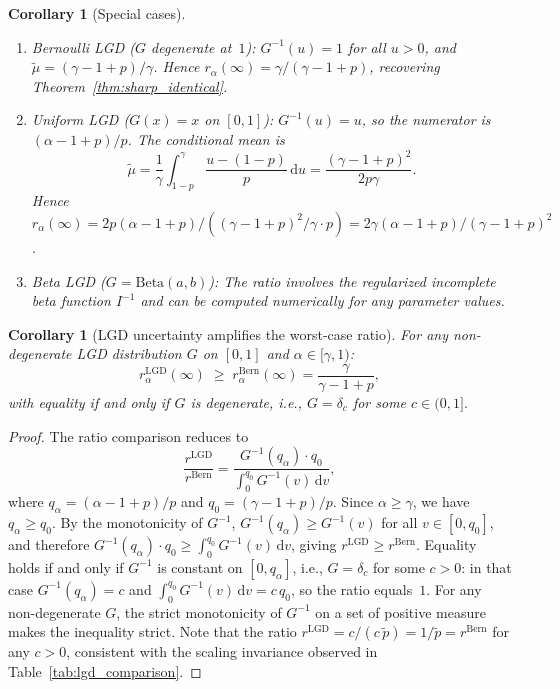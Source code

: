 \documentclass[11pt]{article}
\newtheorem{corollary}[theorem]{Corollary}
\theoremstyle{definition}
\newcommand{\dd}{\mathrm{d}}
\newcommand{\1}{\mathbf{1}}
\begin{document}
\begin{corollary}[Special cases]\label{cor:lgd_special}
\mbox{}
\begin{enumerate}[label=(\alph*)]
  \item \emph{Bernoulli LGD} ($G$ degenerate at~$1$): $G^{-1}(u) = 1$ for all $u > 0$, and $\tilde{\mu} = (\gamma - 1 + p)/\gamma$. Hence $r_\alpha(\infty) = \gamma/(\gamma - 1 + p)$, recovering Theorem~\ref{thm:sharp_identical}.

  \item \emph{Uniform LGD} ($G(x) = x$ on $[0,1]$): $G^{-1}(u) = u$, so the numerator is $(\alpha - 1 + p)/p$. The conditional mean is
  \[
    \tilde{\mu} = \frac{1}{\gamma}\int_{1-p}^\gamma \frac{u - (1-p)}{p}\,\dd u = \frac{(\gamma - 1 + p)^2}{2p\gamma}.
  \]
  Hence $r_\alpha(\infty) = 2p(\alpha - 1 + p) / ((\gamma - 1 + p)^2/\gamma \cdot p) = 2\gamma(\alpha - 1 + p)/(\gamma - 1 + p)^2$.

  \item \emph{Beta LGD} ($G = \mathrm{Beta}(a,b)$): The ratio involves the regularized incomplete beta function $I^{-1}$ and can be computed numerically for any parameter values.
\end{enumerate}
\end{corollary}

\begin{corollary}[LGD uncertainty amplifies the worst-case ratio]\label{cor:lgd_amplification}
For any non-degenerate LGD distribution $G$ on $[0,1]$ and $\alpha \in [\gamma, 1)$:
\begin{equation}\label{eq:lgd_amplification}
  r_\alpha^{\mathrm{LGD}}(\infty) \;\geq\; r_\alpha^{\mathrm{Bern}}(\infty) = \frac{\gamma}{\gamma - 1 + p},
\end{equation}
with equality if and only if $G$ is degenerate, i.e., $G = \delta_c$ for some $c \in (0,1]$.
\end{corollary}

\begin{proof}
The ratio comparison reduces to
\[
  \frac{r^{\mathrm{LGD}}}{r^{\mathrm{Bern}}}
  = \frac{G^{-1}(q_\alpha) \cdot q_0}{\int_0^{q_0} G^{-1}(v)\,\dd v},
\]
where $q_\alpha = (\alpha-1+p)/p$ and $q_0 = (\gamma-1+p)/p$. Since $\alpha \geq \gamma$, we have $q_\alpha \geq q_0$. By the monotonicity of $G^{-1}$, $G^{-1}(q_\alpha) \geq G^{-1}(v)$ for all $v \in [0, q_0]$, and therefore $G^{-1}(q_\alpha) \cdot q_0 \geq \int_0^{q_0} G^{-1}(v)\,\dd v$, giving $r^{\mathrm{LGD}} \geq r^{\mathrm{Bern}}$. Equality holds if and only if $G^{-1}$ is constant on $[0, q_\alpha]$, i.e., $G = \delta_c$ for some $c > 0$: in that case $G^{-1}(q_\alpha) = c$ and $\int_0^{q_0} G^{-1}(v)\,\dd v = c\,q_0$, so the ratio equals~$1$. For any non-degenerate $G$, the strict monotonicity of $G^{-1}$ on a set of positive measure makes the inequality strict. Note that the ratio $r^{\mathrm{LGD}} = c / (c\,\tilde{p}) = 1/\tilde{p} = r^{\mathrm{Bern}}$ for any $c > 0$, consistent with the scaling invariance observed in Table~\ref{tab:lgd_comparison}.

\end{proof}
\end{document}

